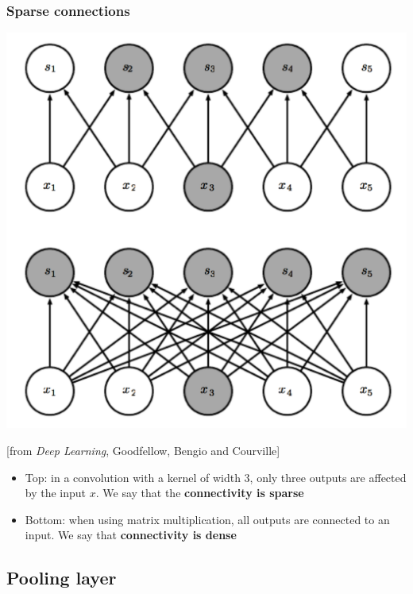 \begin{frame}
	\frametitle{Sparse connections}
	\begin{center}
		\includegraphics[width=0.5\textheight]{figs/weights-sharing1}
		
		{\small [from \emph{Deep Learning}, Goodfellow, Bengio and Courville]}
	\end{center}
	\begin{itemize}
		\medskip 
		
		\item Top: in a convolution with a kernel of width 3, only three outputs are affected by the input $x$. We say that the \textbf{connectivity is sparse} 
		
		\medskip 
		
		\item Bottom: when using matrix multiplication, all outputs are connected to an input. We say that \textbf{connectivity is dense}
	\end{itemize}
\end{frame}



\subsection{Pooling layer}

